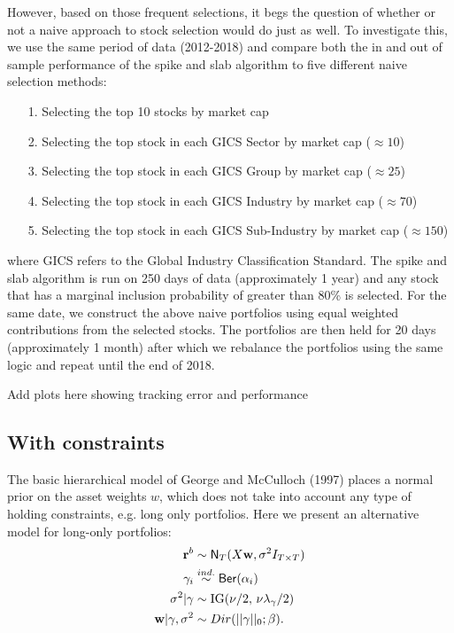 \documentclass[a4paper, 12pt]{article}
\theoremstyle{plain}
\theoremstyle{definition}
\theoremstyle{remark}
\newcommand{\ber}{{\sf Ber}}
\newcommand{\nm}{{\sf N}}
\begin{document}
However, based on those frequent selections, it begs the question of whether or not a naive approach to stock selection would do just as well. To investigate this, we use the same period of data (2012-2018) and compare both the in and out of sample performance of the spike and slab algorithm to five different naive selection methods:
\begin{itemize}
	\itemsep=0em
	\item[1.] Selecting the top 10 stocks by market cap
	\item[2.] Selecting the top stock in each GICS Sector by market cap ($\approx 10$)
	\item[3.] Selecting the top stock in each GICS Group by market cap ($\approx 25$)
	\item[4.] Selecting the top stock in each GICS Industry by market cap ($\approx 70$)
	\item[5.] Selecting the top stock in each GICS Sub-Industry by market cap ($\approx 150$)
\end{itemize}
where GICS refers to the Global Industry Classification Standard. The spike and slab algorithm is run on 250 days of data (approximately 1 year) and any stock that has a marginal inclusion probability of greater than 80\% is selected. For the same date, we construct the above naive portfolios using equal weighted contributions from the selected stocks. The portfolios are then held for 20 days (approximately 1 month) after which we rebalance the portfolios using the same logic and repeat until the end of 2018.

{\color{red} Add plots here showing tracking error and performance}



\subsection{With constraints}
The basic hierarchical model of George and McCulloch (1997) places a normal prior on the asset weights $w$, which does not take into account any type of holding constraints, e.g. long only portfolios.  Here we present an alternative model for long-only portfolios:
\begin{align}
\textbf{r}^b &\sim \nm_{T}(X\textbf{w}, \sigma^2I_{T\times T})\\
\gamma_i &\stackrel{ind.}{\sim} \ber(\alpha_i) \\
\sigma^2 | \gamma & \sim \text{IG}(\nu/2,\,\nu\lambda_\gamma/2)\\
\textbf{w}|\gamma, \sigma^2 & \sim Dir(||\gamma||_0; \beta).
\end{align}
\end{document}
